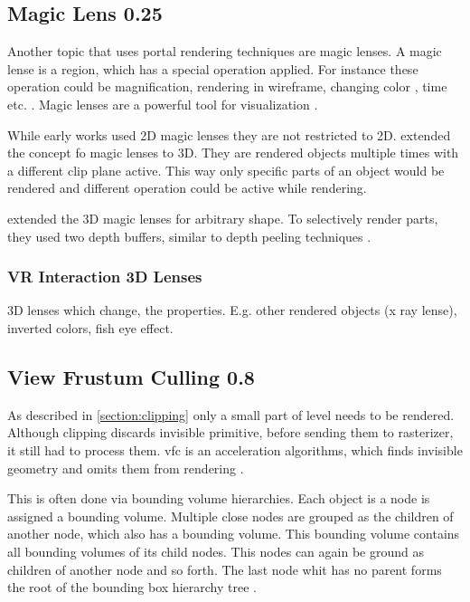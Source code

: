 \subsection{Magic Lens 0.25}
Another topic that uses portal rendering techniques are magic lenses. A magic lense is a region, which has a special operation applied. For instance these operation could be magnification, rendering in wireframe, changing color \cite{bier:1993:toolglass}, time \cite{ryall:2005:temporal, tiesel:2009:composable} etc. . Magic lenses are a powerful tool for visualization  \cite{bier:1993:toolglass, tominski:2014:survey}.

While early works used 2D magic lenses \cite{bier:1993:toolglass} they are not restricted to 2D. \textcite{viega:1996:3d} extended the concept fo magic lenses to 3D. They  are rendered objects multiple times with a different clip plane active. This way only specific parts of an object would be rendered and different operation could be active while rendering.

\textcite{ropinski:2004:real} extended the 3D magic lenses for arbitrary shape. To selectively render parts, they used two depth buffers, similar to depth peeling techniques \cite{everitt:2001:interactive}.


\subsubsection{VR Interaction 3D Lenses}
\cite{borst:2009:real}
3D lenses which change, the properties. E.g. other rendered objects (x ray lense), inverted colors, fish eye effect.


\subsection{View Frustum Culling 0.8}
As described in \ref{section:clipping} only a small part of level needs to be rendered. Although clipping discards invisible primitive, before sending them to rasterizer, it still had to process them. \Gls{vfc} is an acceleration algorithms, which finds invisible geometry and omits them from rendering \cite{assarsson:2000:optimized, akine:2018:realtime}.

This is often done via bounding volume hierarchies. Each object is a node is assigned a bounding volume. Multiple close nodes are grouped as the children of another node, which also has a bounding volume. This bounding volume contains all bounding volumes of its child nodes. This nodes can again be ground as children of another node and so forth. The last node whit has no parent forms the root of the bounding box hierarchy tree \cite{clark:1976:hierarchical, assarsson:2000:optimized, akine:2018:realtime}.

